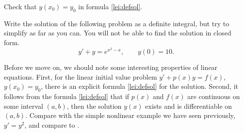\begin{exercise}
Check that $y(x_0) = y_0$ in formula \eqref{lei:defsol}.
\end{exercise}

\begin{exercise}
Write the solution of the following problem
as a definite integral, but try to simplify as far as you can.  You will not
be able to find the solution in closed form.
\begin{equation*}
y' + y = e^{x^2-x}, \qquad y(0) = 10 .
\end{equation*}
\end{exercise}

\begin{remark}
Before we move on, we should note some interesting properties of linear
equations.  First, for the linear initial value problem
$y' + p(x) y = f(x)$, $y(x_0) = y_0$,
there is an explicit formula \eqref{lei:defsol} for the
solution.  Second, it follows
from the formula \eqref{lei:defsol} that if $p(x)$
and $f(x)$ are continuous on some interval $(a,b)$, then the 
solution $y(x)$ exists and is differentiable on $(a,b)$.  Compare
with the simple nonlinear example we have seen previously, $y'=y^2$,
and compare to .
\end{remark}


